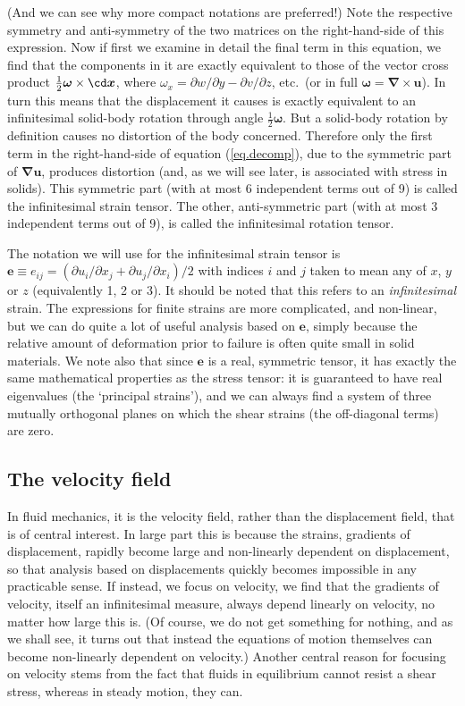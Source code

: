\documentclass[twoside,11pt]		{report}
\begin{document}
(And we can see why more compact notations are preferred!) Note the
respective symmetry and anti-symmetry of the two matrices on the
right-hand-side of this expression. Now if first we examine in detail
the final term in this equation, we find that the components in it are
exactly equivalent to those of the vector cross product
$\frac{1}{2}\bm{\omega}\times\cd \bm{x}$, where $\omega_{x}=\partial
w/\partial y - \partial v/\partial z$, etc.\ (or in full
$\bm{\omega}=\bm{\nabla}\times\bm{u}$). In turn this means that the
displacement it causes is exactly equivalent to an infinitesimal
solid-body rotation through angle $\frac{1}{2}\bm{\omega}$. But a
solid-body rotation by definition causes no distortion of the body
concerned. Therefore only the first term in the right-hand-side of
equation (\ref{eq.decomp}), due to the symmetric part of $\bm{\nabla
u}$, produces distortion (and, as we will see later, is associated
with stress in solids). This symmetric part (with at most 6
independent terms out of 9) is called the infinitesimal strain
tensor. The other, anti-symmetric part (with at most 3 independent
terms out of 9), is called the infinitesimal rotation tensor.

The notation we will use for the infinitesimal strain tensor is
$\bm{e}\equiv e_{ij}=(\partial u_i/\partial x_j + \partial
u_j/\partial x_i)/2$ with indices $i$ and $j$ taken to mean any of
$x$, $y$ or $z$ (equivalently 1, 2 or 3). It should be noted that this
refers to an \emph{infinitesimal} strain. The expressions for finite
strains are more complicated, and non-linear, but we can do quite a
lot of useful analysis based on $\bm{e}$, simply because the relative
amount of deformation prior to failure is often quite small in solid
materials. We note also that since $\bm{e}$ is a real, symmetric
tensor, it has exactly the same mathematical properties as the stress
tensor: it is guaranteed to have real eigenvalues (the `principal
strains'), and we can always find a system of three mutually
orthogonal planes on which the shear strains (the off-diagonal terms)
are zero.

\subsection{The velocity field}

In fluid mechanics, it is the velocity field, rather than the
displacement field, that is of central interest. In large part this is
because the strains, \ie gradients of displacement, rapidly become
large and non-linearly dependent on displacement, so that analysis
based on displacements quickly becomes impossible in any practicable
sense. If instead, we focus on velocity, we find that the gradients of
velocity, itself an infinitesimal measure, always depend linearly on
velocity, no matter how large this is.  (Of course, we do not get
something for nothing, and as we shall see, it turns out that instead
the equations of motion themselves can become non-linearly dependent
on velocity.) Another central reason for focusing on velocity stems
from the fact that fluids in equilibrium cannot resist a shear stress,
whereas in steady motion, they can.
\end{document}
